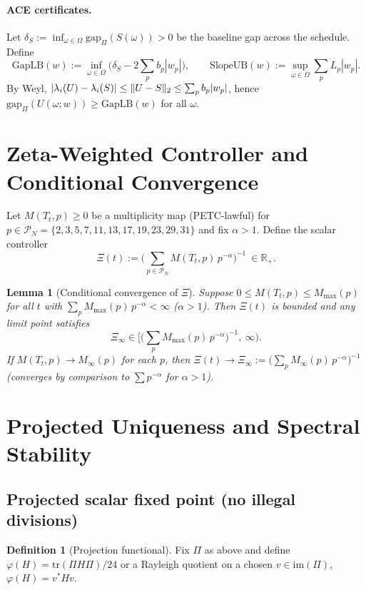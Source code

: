 \documentclass[11pt]{article}
\DeclarePairedDelimiter{\norm}{\lVert}{\rVert}
\newcommand{\R}{\mathbb{R}}
\newcommand{\Tr}{\mathrm{tr}}
\newcommand{\GapLB}{\mathrm{GapLB}}
\newcommand{\SlopeUB}{\mathrm{SlopeUB}}
\newcommand{\im}{\mathrm{im}}
\newcommand{\gapPi}[1]{\mathrm{gap}_{\Pi}\!\left(#1\right)}
\newcommand{\MoonRank}{24}         %
\newcommand{\MoonProj}{\Pi}        %
\newcommand{\PrimeSet}{\{2,3,5,7,11,13,17,19,23,29,31\}} %
\theoremstyle{plain}
\newtheorem{lemma}{Lemma}
\theoremstyle{definition}
\newtheorem{definition}{Definition}
\theoremstyle{remark}
\begin{document}
\paragraph{ACE certificates.}
Let $\delta_S:=\inf_{\omega\in\Omega}\gapPi{S(\omega)}>0$ be the baseline gap across the schedule. Define
\[
\GapLB(w):=\inf_{\omega\in\Omega}\Big(\delta_S-2\sum_p b_p|w_p|\Big),\qquad
\SlopeUB(w):=\sup_{\omega\in\Omega}\sum_p L_p|w_p|.
\]
By Weyl, $|\lambda_i(U)-\lambda_i(S)|\le \norm{U-S}_2\le\sum_p b_p|w_p|$, hence $\gapPi{U(\omega;w)}\ge \GapLB(w)$ for all $\omega$.

\section{Zeta-Weighted Controller and Conditional Convergence}
\label{sec:xi}
Let $M(T_t,p)\ge 0$ be a multiplicity map (PETC-lawful) for $p\in\mathcal{P}_N=\PrimeSet$ and fix $\alpha>1$. Define the scalar controller
\begin{equation}
\label{eq:xi}
\Xi(t):=\Bigg(\sum_{p\in\mathcal{P}_N} M(T_t,p)\,p^{-\alpha}\Bigg)^{-1}\ \in \R_{+}.
\end{equation}

\begin{lemma}[Conditional convergence of $\Xi$]
\label{lem:xi-conv}
Suppose $0\le M(T_t,p)\le M_{\max}(p)$ for all $t$ with $\sum_{p} M_{\max}(p)\,p^{-\alpha}<\infty$ ($\alpha>1$). Then $\Xi(t)$ is bounded and any limit point satisfies
\[
\Xi_\infty\in\Big[\big(\sum_p M_{\max}(p)\,p^{-\alpha}\big)^{-1},\ \infty\Big).
\]
If $M(T_t,p)\to M_\infty(p)$ for each $p$, then $\Xi(t)\to \Xi_\infty:=\Big(\sum_p M_\infty(p)\,p^{-\alpha}\Big)^{-1}$ \emph{(converges by comparison to $\sum p^{-\alpha}$ for $\alpha>1$)}.
\end{lemma}

\section{Projected Uniqueness and Spectral Stability}
\subsection{Projected scalar fixed point (no illegal divisions)}
\begin{definition}[Projection functional]
\label{def:phi}
Fix $\MoonProj$ as above and define $\varphi(H)=\Tr(\MoonProj H \MoonProj)/\MoonRank$ or a Rayleigh quotient on a chosen $v\in\im(\MoonProj)$, $\varphi(H)=v^*Hv$.
\end{definition}
\end{document}
